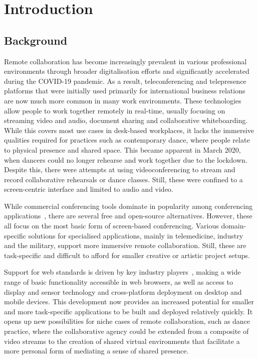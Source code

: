 \chapter{Introduction}
\label{ch:introduction}

\section{Background}
\label{sec:background}

Remote collaboration has become increasingly prevalent in various professional environments through broader digitalisation efforts and significantly accelerated during the COVID-19 pandemic.
As a result, teleconferencing and telepresence platforms that were initially used primarily for international business relations are now much more common in many work environments.
These technologies allow people to work together remotely in real-time, usually focusing on streaming video and audio, document sharing and collaborative whiteboarding.
While this covers most use cases in desk-based workplaces, it lacks the immersive qualities required for practices such as contemporary dance, where people relate to physical presence and shared space.
This became apparent in March 2020, when dancers could no longer rehearse and work together due to the lockdown.
Despite this, there were attempts at using videoconferencing to stream and record collaborative rehearsals or dance classes.
Still, these were confined to a screen-centric interface and limited to audio and video.

While commercial conferencing tools dominate in popularity among conferencing applications~\parencite{mostPopularConferencingPlatforms}, there are several free and open-source alternatives.
However, these all focus on the most basic form of screen-based conferencing.
Various domain-specific solutions for specialised applications, mainly in telemedicine, industry and the military, support more immersive remote collaboration.
Still, these are task-specific and difficult to afford for smaller creative or artistic project setups.

Support for web standards is driven by key industry players~\parencite{pushingInteroperabilityForward}, making a wide range of basic functionality accessible in web browsers, as well as access to display and sensor technology and cross-platform deployment on desktop and mobile devices.
This development now provides an increased potential for smaller and more task-specific applications to be built and deployed relatively quickly.
It opens up new possibilities for niche cases of remote collaboration, such as dance practice, where the collaborative agency could be extended from a composite of video streams to the creation of shared virtual environments that facilitate a more personal form of mediating a sense of shared presence.

